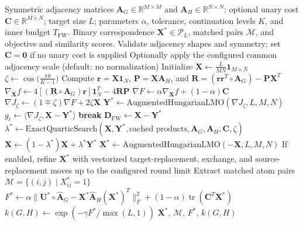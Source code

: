 \documentclass[conference]{IEEEtran}
\begin{document}
\begin{algorithm}[t]
\caption{Fast-WCS Analytical Homotopy and Frank-Wolfe Optimization (Phase 1)}
\label{alg:fast_wcs}
\begin{algorithmic}[1]
\REQUIRE Symmetric adjacency matrices $\mathbf{A}_G \in \mathbb{R}^{M \times M}$ and $\mathbf{A}_H \in \mathbb{R}^{N \times N}$; optional unary cost $\mathbf{C} \in \mathbb{R}^{M \times N}$; target size $L$; parameters $\alpha$, tolerance, continuation levels $K$, and inner budget $T_{\text{FW}}$.
\ENSURE Binary correspondence $\mathbf{X}^* \in \mathcal{P}_L$, matched pairs $\mathcal{M}$, and objective and similarity scores.
\STATE Validate adjacency shapes and symmetry; set $\mathbf{C}=\mathbf{0}$ if no unary cost is supplied
\STATE Optionally apply the configured common adjacency scale (default: no normalization)
\STATE Initialize $\mathbf{X} \leftarrow \frac{L}{MN}\mathbf{1}_{M \times N}$
    \STATE $\zeta \leftarrow \cos\big(\frac{\pi k}{K - 1}\big)$ 
        \STATE Compute $\mathbf{r}=\mathbf{X}\mathbf{1}_N$, $\mathbf{P}=\mathbf{X}\mathbf{A}_H$, and $\mathbf{R}=(\mathbf{r}\mathbf{r}^T\circ\mathbf{A}_G)-\mathbf{P}\mathbf{X}^T$
        \STATE $\nabla_{\mathbf{X}} f \leftarrow 4[(\mathbf{R}\circ\mathbf{A}_G)\mathbf{r}]\mathbf{1}_N^T - 4\mathbf{R}\mathbf{P}$ 
        \STATE $\nabla F \leftarrow \alpha \nabla_{\mathbf{X}} f + (1 - \alpha)\mathbf{C}$
        \STATE $\nabla J_\zeta \leftarrow (1 \mp \zeta)\nabla F + 2\zeta \mathbf{X}$ 
        \STATE $\mathbf{Y}^* \leftarrow \text{AugmentedHungarianLMO}(\nabla J_\zeta, L, M, N)$
        \STATE $g_t \leftarrow \langle \nabla J_\zeta, \mathbf{X} - \mathbf{Y}^* \rangle$
            \STATE \textbf{break} 
        \ENDIF
        \STATE $\mathbf{D}_{\text{FW}} \leftarrow \mathbf{X} - \mathbf{Y}^*$ 
        \STATE $\lambda^* \leftarrow \text{ExactQuarticSearch}(\mathbf{X}, \mathbf{Y}^*, \text{cached products}, \mathbf{A}_G, \mathbf{A}_H, \mathbf{C}, \zeta)$
        \STATE $\mathbf{X} \leftarrow (1 - \lambda^*)\mathbf{X} + \lambda^* \mathbf{Y}^*$ 
    \ENDFOR
\ENDFOR
\STATE $\mathbf{X}^* \leftarrow \text{AugmentedHungarianLMO}(-\mathbf{X}, L, M, N)$
\STATE If enabled, refine $\mathbf{X}^*$ with vectorized target-replacement, exchange, and source-replacement moves up to the configured round limit
\STATE Extract matched atom pairs $\mathcal{M} = \{(i, j) \mid X^*_{ij} = 1\}$
\STATE $F^* \leftarrow \alpha \|\mathbf{U}^* \circ \hat{\mathbf{A}}_G - \mathbf{X}^*\hat{\mathbf{A}}_H(\mathbf{X}^*)^T\|_F^2 + (1 - \alpha)\operatorname{tr}(\mathbf{C}^T\mathbf{X}^*)$
\STATE $k(G,H) \leftarrow \exp(-\gamma F^* / \max(L,1))$
\RETURN $\mathbf{X}^*$, $\mathcal{M}$, $F^*$, $k(G,H)$
\end{algorithmic}
\end{algorithm}
\end{document}
